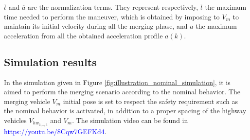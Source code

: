 $ \overline{t}$  and  $\overline{a}$ are the normalization terms. They represent respectively, 
$ \overline{t}$ the maximum time needed to perform the maneuver, which is obtained by imposing to $V_{m}$ to maintain its initial velocity during all the merging phase, and $\overline{a}$ the maximum acceleration from all the obtained acceleration profile $a(k)$.



\subsection{Simulation results} \label{sec:nominal_simulation_results}

In the simulation given in Figure \ref{fig:illustration_nominal_simulation}, it is aimed to perform the merging scenario according to the nominal behavior. The merging vehicle $V_m$ initial pose is set to respect the safety requirement such as the nominal behavior is activated, in addition to a proper spacing of the highway vehicles $V_{hw_{1,..,3}}$ and $V_m$. The simulation video can be found in \textcolor{blue}{https://youtu.be/8Cqw7GEFKd4}. 



